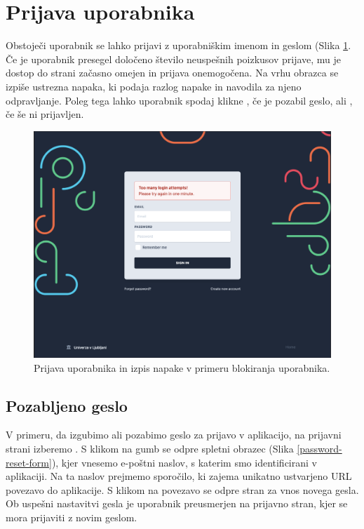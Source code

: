 \documentclass[a4paper, 12pt]{book}
\begin{document}
\newpage
\section{Prijava uporabnika }
\label{sign-in-page}
Obstoječi uporabnik se lahko prijavi z uporabniškim imenom in geslom (Slika \ref{login-form}. Če je uporabnik presegel določeno število neuspešnih poizkusov prijave, mu je dostop do strani začasno omejen in prijava onemogočena. Na vrhu obrazca se izpiše ustrezna napaka, ki podaja razlog napake in navodila za njeno odpravljanje. Poleg tega lahko uporabnik spodaj klikne , če je pozabil geslo, ali , če še ni prijavljen.


\begin{figure}[h]
\begin{center}
\includegraphics[width=1\textwidth]{slike/signin-throttling.png}
\end{center}
\caption{ Prijava uporabnika in izpis napake v primeru blokiranja uporabnika. }
\label{login-form}
\end{figure}

\subsection{Pozabljeno geslo}
\label{forgotten-form}
V primeru, da izgubimo ali pozabimo geslo za prijavo v aplikacijo, na prijavni strani izberemo . S klikom na gumb se odpre spletni obrazec (Slika \ref{password-reset-form}), kjer vnesemo e-poštni naslov, s katerim smo identificirani v aplikaciji. Na ta naslov prejmemo sporočilo, ki zajema unikatno ustvarjeno URL povezavo do aplikacije. S klikom na povezavo se odpre stran za vnos novega gesla. Ob uspešni nastavitvi gesla je uporabnik preusmerjen na prijavno stran, kjer se mora prijaviti z novim geslom.
\end{document}
